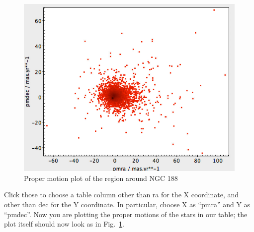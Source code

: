 \documentclass[twocolumn,apj]{openjournal}
\begin{document}
\begin{figure}[htbp]
\begin{center}
\includegraphics[width=\linewidth]{ngc188pm.jpg}
\caption{Proper motion plot of the region around NGC 188}
\label{NGC188PM}
\end{center}
\end{figure}
Click those to choose a table column other than ra for the X coordinate, and other than dec for the Y coordinate. In particular, choose X as ``pmra'' and Y as ``pmdec''. Now you are plotting the proper motions of the stars in our table; the plot itself should now look as in Fig.~\ref{NGC188PM}.
\end{document}
